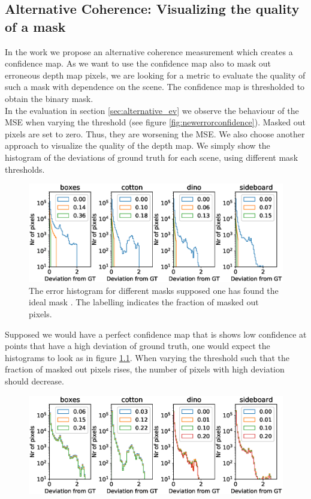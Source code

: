 \documentclass  [
  paper    = a4,
  BCOR     = 10mm,
  twoside,
  fontsize = 12pt,
  fleqn,
  toc      = bibnumbered,
  toc      = listofnumbered,
  numbers  = noendperiod,
  headings = normal,
  listof   = leveldown,
  version  = 3.03
]                                       {scrreprt}
\begin{document}
\begin{appendix}
\chapter{Alternative Coherence: Visualizing the quality of a mask}
\label{sec:alternative_app}
In the work we propose an alternative coherence measurement which creates a confidence map. As we want to use the confidence map also to mask out erroneous depth map pixels, we are looking for a metric to evaluate the quality of such a mask with dependence on the scene. The confidence map is thresholded to obtain the binary mask.\\
In the evaluation in section \ref{sec:alternative_ev} we observe the behaviour of the MSE when varying the threshold (see figure \ref{fig:newerrorconfidence}). Masked out pixels are set to zero. Thus, they are worsening the MSE. We also choose another approach to visualize the quality of the depth map. We simply show the histogram of the deviations of ground truth for each scene, using different mask thresholds.
\begin{figure}[h!]
	\centering
	\includegraphics[width=0.8\linewidth]{images/histogram_error_mask_perfect}
	\caption[Histogram when masking errors with new error map]{The error histogram for different masks supposed one has found the ideal mask . The labelling indicates the fraction of masked out pixels.}
	\label{fig:histogramerrormaskperfect}
\end{figure}
Supposed we would have a perfect confidence map that is shows low confidence at points that have a high deviation of ground truth, one would expect the histograms to look as in figure \ref{fig:histogramerrormaskperfect}. When varying the threshold such that the fraction of masked out pixels rises, the number of pixels with high deviation should decrease. 
\begin{figure}[h!]
	\centering
	\includegraphics[width=0.8\linewidth]{images/histogram_error_mask_random}

\end{figure}
\end{appendix}
\end{document}
